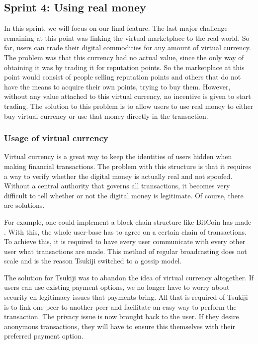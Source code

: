 \subsection{Sprint 4: Using real money}
In this sprint, we will focus on our final feature.
The last major challenge remaining at this point was linking the virtual marketplace to the real world.
So far, users can trade their digital commodities for any amount of virtual currency.
The problem was that this currency had no actual value, since the only way of obtaining it was by trading it for reputation points.
So the marketplace at this point would consist of people selling reputation points and others that do not have the means to acquire their own points, trying to buy them.
However, without any value attached to this virtual currency, no incentive is given to start trading.
The solution to this problem is to allow users to use real money to either buy virtual currency or use that money directly in the transaction.

\subsubsection{Usage of virtual currency}
Virtual currency is a great way to keep the identities of users hidden when making financial transactions. 
The problem with this structure is that it requires a way to verify whether the digital money is actually real and not spoofed. 
Without a central authority that governs all transactions, it becomes very difficult to tell whether or not the digital money is legitimate.
Of course, there are solutions.

For example, one could implement a block-chain structure like BitCoin has made \cite{bitcoin}.
With this, the whole user-base has to agree on a certain chain of transactions.
To achieve this, it is required to have every user communicate with every other user what transactions are made.
This method of regular broadcasting does not scale and is the reason Tsukiji switched to a gossip model.

The solution for Tsukiji was to abandon the idea of virtual currency altogether.
If users can use existing payment options, we no longer have to worry about security en legitimacy issues that payments bring.
All that is required of Tsukiji is to link one peer to another peer and facilitate an easy way to perform the transaction.
The privacy issue is now brought back to the user.
If they desire anonymous transactions, they will have to ensure this themselves with their preferred payment option.

